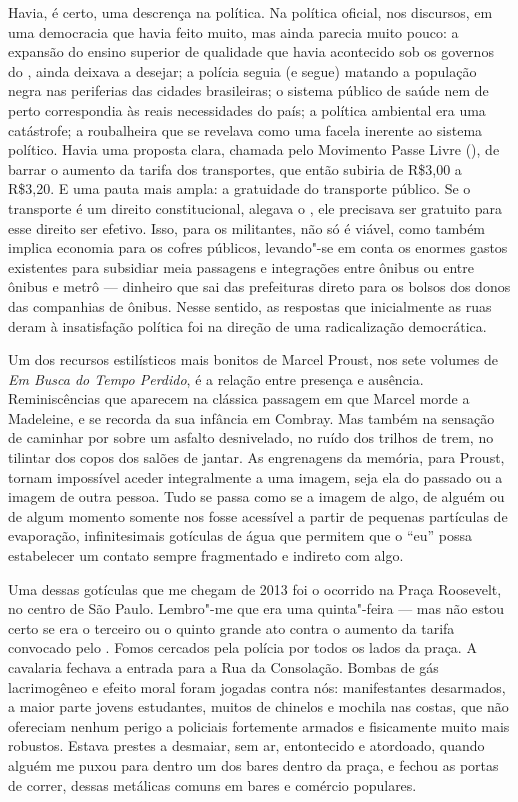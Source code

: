 Havia, é certo, uma descrença na política. Na política oficial, nos
discursos, em uma democracia que havia feito muito, mas ainda parecia
muito pouco: a expansão do ensino superior de qualidade que havia
acontecido sob os governos do , ainda deixava a desejar; a polícia
seguia (e segue) matando a população negra nas periferias das cidades
brasileiras; o sistema público de saúde nem de perto correspondia às
reais necessidades do país; a política ambiental era uma catástrofe; a
roubalheira que se revelava como uma facela inerente ao sistema
político. Havia uma proposta clara, chamada pelo Movimento Passe Livre
(), de barrar o aumento da tarifa dos transportes, que então subiria
de R\$3,00 a R\$3,20. E uma pauta mais ampla: a gratuidade do transporte
público. Se o transporte é um direito constitucional, alegava o , ele
precisava ser gratuito para esse direito ser efetivo. Isso, para os
militantes, não só é viável, como também implica economia para os cofres
públicos, levando"-se em conta os enormes gastos existentes para
subsidiar meia passagens e integrações entre ônibus ou entre ônibus e
metrô --- dinheiro que sai das prefeituras direto para os bolsos dos
donos das companhias de ônibus. Nesse sentido, as respostas que
inicialmente as ruas deram à insatisfação política foi na direção de uma
radicalização democrática.

Um dos recursos estilísticos mais bonitos de Marcel Proust, nos sete
volumes de \emph{Em Busca do Tempo Perdido}, é a relação entre presença
e ausência. Reminiscências que aparecem na clássica passagem em que
Marcel morde a Madeleine, e se recorda da sua infância em Combray. Mas
também na sensação de caminhar por sobre um asfalto desnivelado, no
ruído dos trilhos de trem, no tilintar dos copos dos salões de jantar.
As engrenagens da memória, para Proust, tornam impossível aceder
integralmente a uma imagem, seja ela do passado ou a imagem de outra
pessoa. Tudo se passa como se a imagem de algo, de alguém ou de algum
momento somente nos fosse acessível a partir de pequenas partículas de
evaporação, infinitesimais gotículas de água que permitem que o ``eu''
possa estabelecer um contato sempre fragmentado e indireto com algo.

Uma dessas gotículas que me chegam de 2013 foi o ocorrido na Praça
Roosevelt, no centro de São Paulo. Lembro"-me que era uma quinta"-feira ---
mas não estou certo se era o terceiro ou o quinto grande ato contra o
aumento da tarifa convocado pelo . Fomos cercados pela polícia por
todos os lados da praça. A cavalaria fechava a entrada para a Rua da
Consolação. Bombas de gás lacrimogêneo e efeito moral foram jogadas
contra nós: manifestantes desarmados, a maior parte jovens estudantes,
muitos de chinelos e mochila nas costas, que não ofereciam nenhum perigo
a policiais fortemente armados e fisicamente muito mais robustos. Estava
prestes a desmaiar, sem ar, entontecido e atordoado, quando alguém me
puxou para dentro um dos bares dentro da praça, e fechou as portas de
correr, dessas metálicas comuns em bares e comércio populares.

